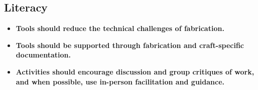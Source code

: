 \documentclass{sigchi}
\begin{document}
\subsection{Literacy}
\begin{itemize}
\item \textbf {Tools should reduce the technical challenges of fabrication.} %

\item \textbf{Tools should be supported through fabrication and craft-specific documentation.} %

\item \textbf{Activities should encourage discussion and group critiques of work, and when possible, use in-person facilitation and guidance.} %
\end{itemize}
\end{document}
